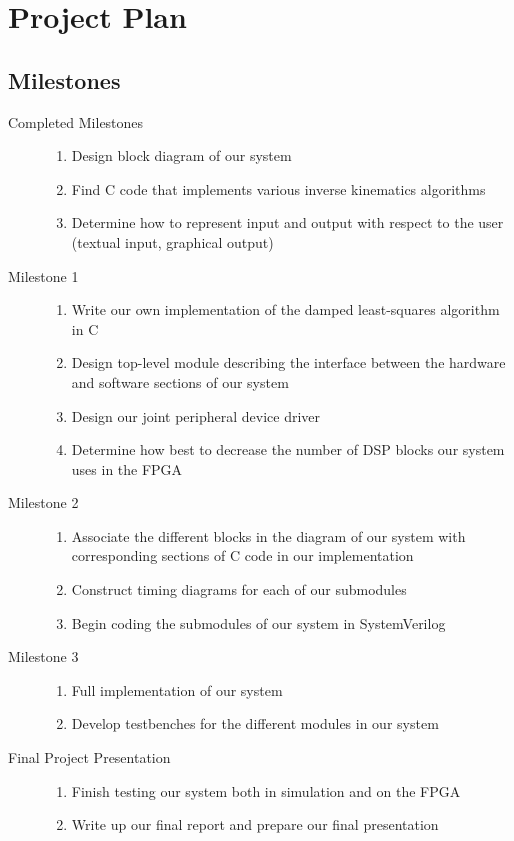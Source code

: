 \section{Project Plan}

\subsection{Milestones}

\begin{description}
\item[Completed Milestones] \hfill
\begin{enumerate}
\item Design block diagram of our system
\item Find C code that implements various inverse kinematics algorithms
\item Determine how to represent input and output with respect to the user (textual input, graphical output)
\end{enumerate}

\item[Milestone 1] \hfill
\begin{enumerate}
\item Write our own implementation of the damped least-squares algorithm in C
\item Design top-level module describing the interface between the hardware and software sections of our system
\item Design our joint peripheral device driver
\item Determine how best to decrease the number of DSP blocks our system uses in the FPGA
\end{enumerate}


\item[Milestone 2] \hfill 
\begin{enumerate}
\item Associate the different blocks in the diagram of our system with corresponding sections of C code in our implementation
\item Construct timing diagrams for each of our submodules
\item Begin coding the submodules of our system in SystemVerilog
\end{enumerate}

\item[Milestone 3] \hfill 
\begin{enumerate}
\item Full implementation of our system
\item Develop testbenches for the different modules in our system
\end{enumerate}

\item[Final Project Presentation] \hfill
\begin{enumerate}
\item Finish testing our system both in simulation and on the FPGA
\item Write up our final report and prepare our final presentation
\end{enumerate}

\end{description}

%
%
%
%
%

